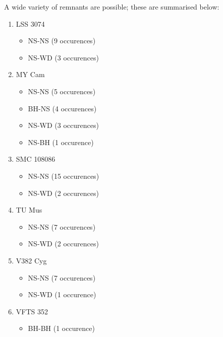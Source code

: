 A wide variety of remnants are possible; these are summarised below:

\begin{enumerate}
    \item LSS 3074
        \begin{itemize}
            \item NS-NS (9 occurences)
            \item NS-WD (3 occurences)
        \end{itemize}
    \item MY Cam
        \begin{itemize}
            \item NS-NS (5 occurences)
            \item BH-NS (4 occurences)
            \item NS-WD (3 occurences)
            \item NS-BH (1 occurence)
        \end{itemize}
    \item SMC 108086
        \begin{itemize}
            \item NS-NS (15 occurences)
            \item NS-WD (2 occurences)
        \end{itemize}
    \item TU Mus
        \begin{itemize}
            \item NS-NS (7 occurences)
            \item NS-WD (2 occurences)
        \end{itemize}
    \item V382 Cyg
        \begin{itemize}
            \item NS-NS (7 occurences)
            \item NS-WD (1 occurence)
        \end{itemize}
    \item VFTS 352
        \begin{itemize}
            \item BH-BH (1 occurence)
        \end{itemize}
\end{enumerate}

